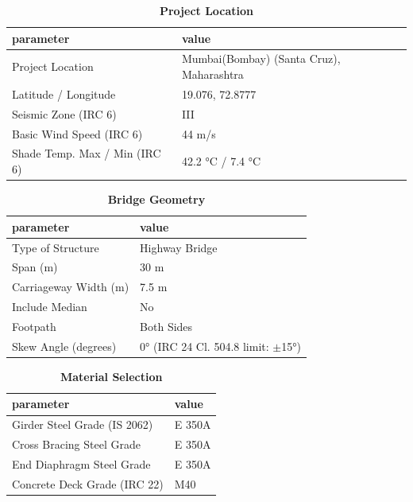 \documentclass[12pt,a4paper]{report}
\numberwithin{table}{chapter}
\numberwithin{figure}{chapter}
\begin{document}
\begin{table}[H]
\caption{\textbf{Project Location}}
\label{subsec:project-location}
\begin{tabular}{|L{5.5cm}|L{8.5cm}|}
\hline
\textbf{parameter} & \textbf{value} \\
\hline
\textnormal{Project Location} & Mumbai(Bombay) (Santa Cruz), Maharashtra \\
\hline
\textnormal{Latitude / Longitude} & 19.076, 72.8777 \\
\hline
\textnormal{Seismic Zone (IRC 6)} & III \\
\hline
\textnormal{Basic Wind Speed (IRC 6)} & 44 m/s \\
\hline
\textnormal{Shade Temp. Max / Min (IRC 6)} & 42.2 °C / 7.4 °C \\
\hline
\end{tabular}
\vspace{0.4cm}
\end{table}

\begin{table}[H]
\caption{\textbf{Bridge Geometry}}
\label{subsec:bridge-geometry}
\begin{tabular}{|L{5.5cm}|L{8.5cm}|}
\hline
\textbf{parameter} & \textbf{value} \\
\hline
\textnormal{Type of Structure} & Highway Bridge \\
\hline
\textnormal{Span (m)} & 30 m \\
\hline
\textnormal{Carriageway Width (m)} & 7.5 m \\
\hline
\textnormal{Include Median} & No \\
\hline
\textnormal{Footpath} & Both Sides \\
\hline
\textnormal{Skew Angle (degrees)} & 0° (IRC 24 Cl. 504.8 limit: $\pm$15°) \\
\hline
\end{tabular}
\end{table}
\vspace{0.4cm}

\begin{table}[H]
\caption{\textbf{Material Selection}}
\label{subsec:material}
\begin{tabular}{|L{5.5cm}|L{8.5cm}|}
\hline
\textbf{parameter} & \textbf{value} \\
\hline
\textnormal{Girder Steel Grade (IS 2062)} & E 350A \\
\hline
\textnormal{Cross Bracing Steel Grade} & E 350A \\
\hline
\textnormal{End Diaphragm Steel Grade} & E 350A \\
\hline
\textnormal{Concrete Deck Grade (IRC 22)} & M40 \\
\hline
\end{tabular}
\end{table}
\vspace{0.4cm}
\end{document}
